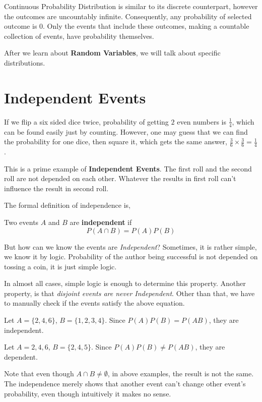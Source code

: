 \par 

Continuous Probability Distribution is similar to its discrete counterpart, however the outcomes are uncountably infinite. Consequently, any probability of selected outcome is $0$. Only the events that include these outcomes, making a countable collection of events, have probability themselves.

\par

After we learn about \textbf{Random Variables}, we will talk about specific distributions.


\section{Independent Events}
If we flip  a six sided dice twice, probability of getting $2$ even numbers is $ \frac{1}{4}$, which can be found easily just by counting. However, one may guess that we can find the probability for one dice, then square it, which gets the same answer, $\frac{3}{6} \times \frac{3}{6}= \frac{1}{4}$.

\par 

This is a prime example of \textbf{Independent Events}. The first roll and the second roll are not depended on each other. Whatever the results in first roll can't influence the result in second roll.

The formal definition of independence is,

\begin{definition}
    Two events $A$ and $B$ are \textbf{independent}  if 
    $$ P(A \cap B) = P(A)P(B)$$ 
\end{definition}
\par

But how can we  know the events are \textit{Independent}? Sometimes, it is rather simple, we know it by logic. Probability of the author being successful is not depended on tossing a coin, it is just simple logic.

In almost all cases, simple logic is enough to determine this property. Another property, is that \textit{disjoint events are never Independent}. Other than that, we have to manually check if the events satisfy the above equation.
\begin{example}
    Let $A = \{ 2,4,6 \}$, $B = \{ 1,2,3,4 \}$. Since $P(A)P(B) = P(AB)$, they are independent.
\end{example}
\begin{example}
    Let $A = {2,4,6}$, $B = \{2,4,5 \}$. Since $P(A)P(B) \neq P(AB)$, they are dependent. \\
\end{example}
Note that even though $A \cap B  \neq \emptyset$, in above examples, the result is not the same. The independence merely shows that another event can't change other event's probability, even though intuitively it makes no sense.
